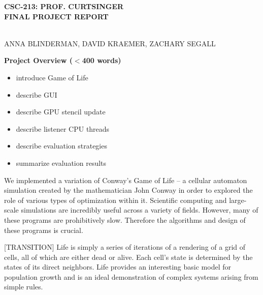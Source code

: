 \documentclass[12pt]{article}
\begin{document}
\setlength{\parindent}{3em}
\setlength{\parskip}{1em}


\newcommand{\ttspc}{\hspace{1mm}}
\newcommand{\tspc}{\hspace{2mm}}
\newcommand{\lspc}{\hspace{10mm}}
\newcommand{\ttc}{, \ttspc}
\newcommand{\nth}{^{\text{th}}}
\newcommand{\mybegit}{\vspace{-2mm} \begin{itemize} \itemsep-.6em }
\newcommand{\mytitle}[1]{\vspace{10mm} \noindent\begin{large} \textbf{{#1}} \end{large}} 




\begin{center}
\begin{Large} \textbf{CSC-213: PROF. CURTSINGER} \\
\vspace{3mm} \textbf{FINAL PROJECT REPORT} \end{Large} \\
\vspace{5mm} ANNA BLINDERMAN, DAVID KRAEMER, ZACHARY SEGALL
\end{center} 






\mytitle{Project Overview ($<$400 words)}
\mybegit
	\item introduce Game of Life
	\item describe GUI
	\item describe GPU stencil update
	\item describe listener CPU threads
	\item describe evaluation strategies
	\item summarize evaluation results
\end{itemize}

	We implemented a variation of Conway's Game of Life -- a cellular automaton simulation created by the mathematician John Conway in order to explored the role of various types of optimization within it. Scientific computing and large-scale simulations are incredibly useful across a variety of fields. However, many of these programs are prohibitively slow. Therefore the algorithms and design of these programs is crucial.
	
	[TRANSITION] Life is simply a series of iterations of a rendering of a grid of cells, all of which are either dead or alive. Each cell's state is determined by the states of its direct neighbors. Life provides an interesting basic model for population growth and is an ideal demonstration of complex systems arising from simple rules. 
\end{document}
